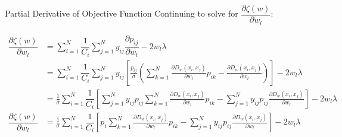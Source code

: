 \documentclass[12pt, a4paper]{article}
\begin{document}
\begin{section}{Partial Derivative of Objective Function}
    Continuing to solve for $\dfrac{\partial \zeta (w)}{\partial w_l}$:

    \begin{align*}
        \dfrac{\partial \zeta (w)}{\partial w_l}
        &= 
            \sum \limits_{i = 1}^N \dfrac{1}{C_i}
            \sum \limits_{j = 1}^N y_{ij} \dfrac{\partial p_{ij}}{\partial w_l}
            - 2 w_l \lambda \\
        &=
            \sum \limits_{i=1}^N \dfrac{1}{C_i}
            \sum \limits_{j=1}^N y_{ij}
            \left [
                \frac{p_{ij}}{\sigma} \left ( 
                \sum \limits_{k=1}^N \frac{\partial D_w(x_i, x_j)}{\partial w_l} p_{ik}
                - 
                \frac{\partial D_w(x_i, x_j)}{\partial w_l} \right)
            \right ]
            - 2 w_l \lambda \\
        &=
            \frac{1}{\sigma}
            \sum \limits_{i=1}^N \dfrac{1}{C_i}
            \left [
            \sum \limits_{j=1}^N y_{ij} p_{ij}
                \sum \limits_{k=1}^N \frac{\partial D_w(x_i, x_j)}{\partial w_l} p_{ik}
                - 
                \sum \limits_{j=1}^N y_{ij} p_{ij}
                \frac{\partial D_w(x_i, x_j)}{\partial w_l}
            \right ]
            - 2 w_l \lambda \\
        \dfrac{\partial \zeta (w)}{\partial w_l}
        &=
            \frac{1}{\sigma}
            \sum \limits_{i=1}^N \dfrac{1}{C_i}
            \left [
                p_i
                \sum \limits_{k=1}^N \frac{\partial D_w(x_i, x_j)}{\partial w_l} p_{ik}
                - 
                \sum \limits_{j=1}^N y_{ij} p_{ij}
                \frac{\partial D_w(x_i, x_j)}{\partial w_l}
            \right ]
            - 2 w_l \lambda \\
    \end{align*}


\end{section}
\end{document}
